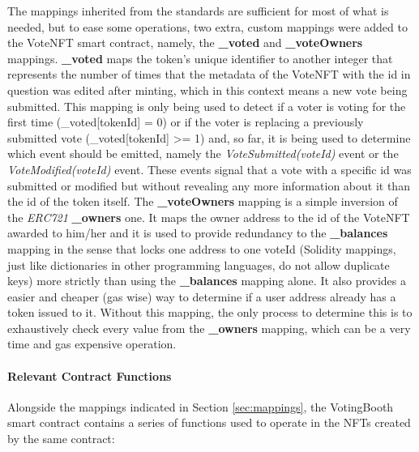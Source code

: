 \documentclass[../main.tex]{subfiles}
\begin{document}
The mappings inherited from the standards are sufficient for most of what is needed, but to ease some operations, two extra, custom mappings were added to the VoteNFT smart contract, namely, the \textbf{\_voted} and \textbf{\_voteOwners} mappings. \textbf{\_voted} maps the token's unique identifier to another integer that represents the number of times that the metadata of the VoteNFT with the id in question was edited after minting, which in this context means a new vote being submitted. This mapping is only being used to detect if a voter is voting for the first time (\_voted[tokenId] = 0) or if the voter is replacing a previously submitted vote (\_voted[tokenId] >= 1) and, so far, it is being used to determine which event should be emitted, namely the \textit{VoteSubmitted(voteId)} event or the \textit{VoteModified(voteId)} event. These events signal that a vote with a specific id was submitted or modified but without revealing any more information about it than the id of the token itself. The \textbf{\_voteOwners} mapping is a simple inversion of the \textit{ERC721} \textbf{\_owners} one. It maps the owner address to the id of the VoteNFT awarded to him/her and it is used to provide redundancy to the \textbf{\_balances} mapping in the sense that locks one address to one voteId (Solidity mappings, just like dictionaries in other programming languages, do not allow duplicate keys) more strictly than using the \textbf{\_balances} mapping alone. It also provides a easier and cheaper (gas wise) way to determine if a user address already has a token issued to it. Without this mapping, the only process to determine this is to exhaustively check every value from the \textbf{\_owners} mapping, which can be a very time and gas expensive operation.

\paragraph{Relevant Contract Functions}
Alongside the mappings indicated in Section \ref{sec:mappings}, the VotingBooth smart contract contains a series of functions used to operate in the NFTs created by the same contract:
\end{document}
